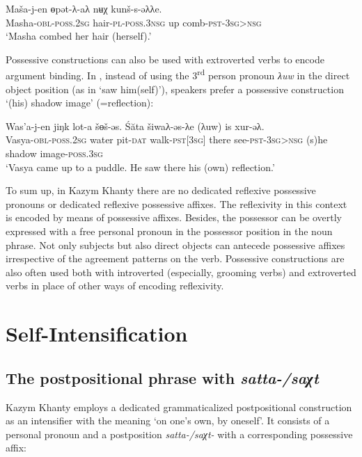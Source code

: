 \documentclass[output=paper]{langscibook}
\begin{document}
\ea 
\label{ex:Volkova:63}
 \gll Maša-j-en  ɵpət-λ-aλ  nʉχ kunš-s-əλλe.\\
 Masha\textsc{{}-obl-poss.2sg} hair\textsc{{}-pl-poss.3nsg} up comb\textsc{{}-pst-3sg>nsg}\\
 \glt ‘Masha combed her hair (herself).’
\z

 
Possessive constructions can also be used with extroverted verbs to encode argument binding. In , instead of using the 3\textsuperscript{rd} person pronoun \textit{λuw} in the direct object position (as in ‘saw him(self)’), speakers prefer a possessive construction ‘(his) shadow image’ (=reflection):

\ea 
\label{ex:Volkova:64}
 \gll Was’a-j-en jiŋk lot-a šɵš-əs. Śăta šiwaλ-əs-λe (λuw) is xur-əλ.\\
 Vasya\textsc{{}-obl-poss.2sg} water pit-\textsc{dat} walk-\textsc{pst[3sg]} there see\textsc{{}-pst-3sg>nsg} (s)he shadow image\textsc{{}-poss.3sg}\\
 \glt ‘Vasya came up to a puddle. He saw there his (own) reflection.’
\z

To sum up, in Kazym Khanty there are no dedicated reflexive possessive pronouns or dedicated reflexive possessive affixes. The reflexivity in this context is encoded by means of possessive affixes. Besides, the possessor can be overtly expressed with a free personal pronoun in the possessor position in the noun phrase. Not only subjects but also direct objects can antecede possessive affixes irrespective of the agreement patterns on the verb. Possessive constructions are also often used both with introverted (especially, grooming verbs) and extroverted verbs in place of other ways of encoding reflexivity.

\section{{Self-Intensification}}\label{sec:Volkova:7}
\subsection{{The} {postpositional} {phrase} {with} {\textit{satta-/saχt}}}\label{sec:Volkova:7.1}

Kazym Khanty employs a dedicated grammaticalized postpositional construction as an intensifier with the meaning ‘on one’s own, by oneself’. It consists of a personal pronoun and a postposition \textit{satta-/saχt-} with a corresponding possessive affix:
\end{document}
